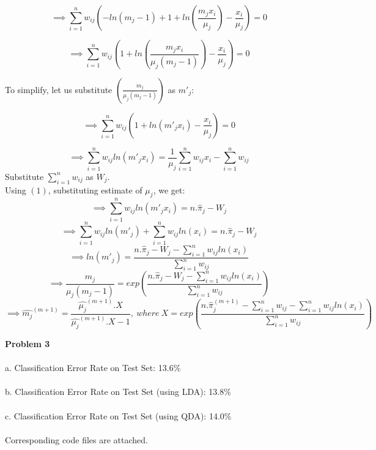 \documentclass[12pt]{article}
\numberwithin{equation}{section}
\numberwithin{figure}{section}
\numberwithin{table}{section}
\begin{document}
\begin{itemize}
\begin{equation*} 
\implies\sum\limits_{i=1}^{n}w_{ij}\left( - ln(m_j-1) + 1  + ln(\frac{m_jx_i}{\mu_j}) - \frac{x_i}{\mu_j}\right) = 0
\end{equation*}

\begin{equation*} 
\implies\sum\limits_{i=1}^{n}w_{ij}\left(1 + ln(\frac{m_jx_i}{\mu_j(m_j-1)}) - \frac{x_i}{\mu_j}\right) = 0
\end{equation*}

To simplify, let us substitute $(\frac{m_j}{\mu_j(m_j-1)})$ as $m'_j$:

\begin{equation*} 
\implies\sum\limits_{i=1}^{n}w_{ij}\left(1 + ln(m'_jx_i) - \frac{x_i}{\mu_j}\right) = 0
\end{equation*}

\begin{equation*} 
\implies\sum\limits_{i=1}^{n}w_{ij}ln(m'_jx_i) = \frac{1}{\mu_j} \sum\limits_{i=1}^{n}w_{ij}x_i - \sum\limits_{i=1}^{n}w_{ij}
\end{equation*}
Substitute $\sum\limits_{i=1}^{n}w_{ij}$ as $W_j$.\\
Using $(1)$, substituting estimate of $\mu_j$, we get:\
\begin{equation*} 
\implies\sum\limits_{i=1}^{n}w_{ij}ln(m'_jx_i) = n.\hat{\pi}_j - W_j
\end{equation*}
\begin{equation*} 
\implies\sum\limits_{i=1}^{n}w_{ij}ln(m'_j) + \sum\limits_{i=1}^{n}w_{ij}ln(x_i) = n.\hat{\pi}_j - W_j
\end{equation*}
\begin{equation*} 
\implies ln(m'_j) = \frac{n.\hat{\pi}_j - W_j - \sum\limits_{i=1}^{n}w_{ij}ln(x_i)}{\sum\limits_{i=1}^{n}w_{ij}}
\end{equation*}
\begin{equation*} 
\implies  \frac{m_j}{\mu_j(m_j-1)} = exp\left(\frac{n.\hat{\pi}_j - W_j - \sum\limits_{i=1}^{n}w_{ij}ln(x_i)}{\sum\limits_{i=1}^{n}w_{ij}}\right)
\end{equation*}
{
\begin{equation*} 
\implies \hat{m_j}^{(m+1)} = \frac{\hat{\mu_j}^{(m+1)}.X}{\hat{\mu_j}^{(m+1)}.X - 1},\ 
where\  X = exp\left(\frac{n.\hat{\pi}_j^{(m+1)} - \sum\limits_{i=1}^{n}w_{ij} - \sum\limits_{i=1}^{n}w_{ij}ln(x_i)}{\sum\limits_{i=1}^{n}w_{ij}}\right)
\end{equation*}
}
\end{itemize}

\bigskip
\bigskip
\bigskip
{\large
{\bf Problem 3}\\\\
\indent a. Classification Error Rate on Test Set: 13.6\% \\\\
\indent b. Classification Error Rate on Test Set (using LDA): 13.8\%\\\\
\indent c. Classification Error Rate on Test Set (using QDA): 14.0\% \\\\
\indent Corresponding code files are attached.
\bigskip
}
\end{document}
